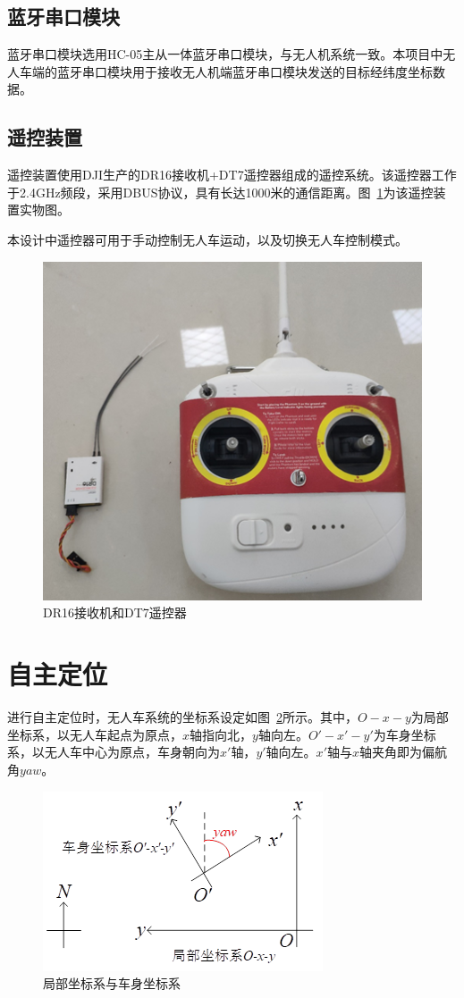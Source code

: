 \subsection{蓝牙串口模块}
蓝牙串口模块选用HC-05主从一体蓝牙串口模块，与无人机系统一致。本项目中无人车端的蓝牙串口模块用于接收无人机端蓝牙串口模块发送的目标经纬度坐标数据。

\subsection{遥控装置}
遥控装置使用DJI生产的DR16接收机+DT7遥控器组成的遥控系统。该遥控器工作于2.4GHz频段，采用DBUS协议，具有长达1000米的通信距离。图~\ref{fig:3-8}为该遥控装置实物图。

本设计中遥控器可用于手动控制无人车运动，以及切换无人车控制模式。

\begin{figure}[htb]
	\centering
	\includegraphics[width=0.8\linewidth]{figures/3-8.png}
	\caption{DR16接收机和DT7遥控器}
	\label{fig:3-8}
\end{figure}

\section{自主定位}
进行自主定位时，无人车系统的坐标系设定如图~\ref{fig:3-9}所示。其中，$O-x-y$为局部坐标系，以无人车起点为原点，$x$轴指向北，$y$轴向左。$O'-x'-y'$为车身坐标系，以无人车中心为原点，车身朝向为$x'$轴，$y'$轴向左。$x'$轴与$x$轴夹角即为偏航角$yaw$。

\begin{figure}[htb]
	\centering
	\includegraphics[width=0.6\linewidth]{figures/3-9.png}
	\caption{局部坐标系与车身坐标系}
	\label{fig:3-9}
\end{figure}

